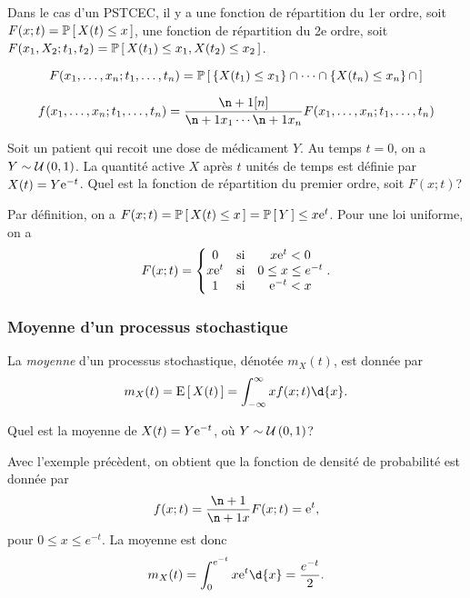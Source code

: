 \documentclass[11pt]{article}
\renewcommand\P[1]{%
	\ensuremath{%
		\mathbb{P}\left[\,#1\,\right]%
	}%
}%
\newcommand\e{%
	\ensuremath{%
		\mathrm{e}%
	}%
}%
\newcommand\Uni[2]{%
	\ensuremath{%
		\mathcal{U}\left(#1,#2\right)%
	}%
}%
\newcommand\Esp[1]{%
	\ensuremath{%
		\mathrm{E}\left[\,#1\,\right]%
	}%
}%
\begin{document}
Dans le cas d'un PSTCEC, il y a une fonction de répartition du 1er ordre, soit
$F(x;t)=\P{X(t)\leq x}$, une fonction de répartition du 2e ordre, soit
$F(x_1,X_2;t_1,t_2)=\P{X(t_1)\leq x_1,X(t_2)\leq x_2}$.

\begin{equation*}
	F(x_1,\dots,x_n;t_1,\dots,t_n)=\P{
		\left\{X(t_1)\leq x_1\right\}\cap\cdots\cap
		\left\{X(t_n)\leq x_n\right\}\cap
	}
\end{equation*}

\begin{equation*}
	f(x_1,\dots,x_n;t_1,\dots,t_n)=\frac{\p[n]{}}{\p{x_1}\cdots\p{x_n}}
		F(x_1,\dots,x_n;t_1,\dots,t_n)
\end{equation*}

\begin{exemple}
	Soit un patient qui recoit une dose de médicament $Y$. Au temps $t=0$, on
	a $Y\sim\Uni{0}{1}$. La quantité active $X$ après $t$ unités de temps est
	définie par $X(t)=Y\e^{-t}$. Quel est la fonction de répartition du
	premier ordre, soit $F(x;t)$?

	Par définition, on a $F(x;t)=\P{X(t)\leq x}=\P{Y}\leq x\e^t$. Pour une loi
	uniforme, on a
	\begin{equation*}
		F(x;t)=\left\{
			\begin{matrix}
				0     &\text{si}& x\e^t<0\\
				x\e^t &\text{si}& 0\leq x\leq e^{-t}\\
				1     &\text{si}& \e^{-t}<x\\
			\end{matrix}
		\right..
	\end{equation*}
\end{exemple}

\subsubsection{Moyenne d'un processus stochastique}
\begin{definition}
	La \textit{moyenne} d'un processus stochastique, dénotée $m_X(t)$, est
	donnée par
	\begin{equation*}
		m_X(t)=\Esp{X(t)}=\int_{-\infty}^\infty xf(x;t)\d{x}.
	\end{equation*}
\end{definition}

\begin{exemple}
	Quel est la moyenne de $X(t)=Y\e^{-t}$, où $Y\sim\Uni{0}{1}$?

	Avec l'exemple précèdent, on obtient que la fonction de densité de
	probabilité est donnée par
	\begin{equation*}
		f(x;t)=\frac{\p{}}{\p{x}}F(x;t)=\e^t,
	\end{equation*}
	pour $0\leq x\leq e^{-t}$. La moyenne est donc
	\begin{equation*}
		m_X(t)=\int_0^{e^{-t}}x\e^t\d{x}=\frac{e^{-t}}{2}.
	\end{equation*}
\end{exemple}
\end{document}
